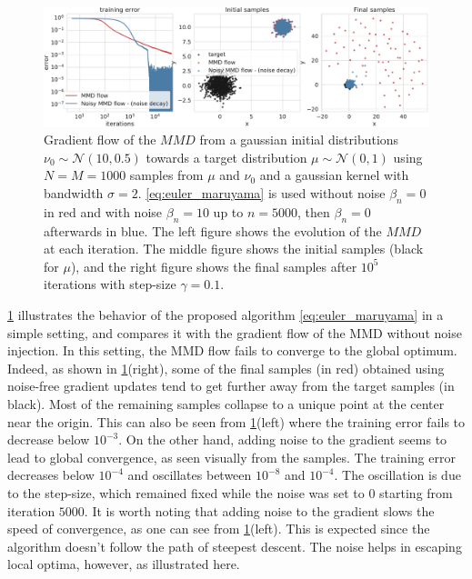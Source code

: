 \begin{figure}[ht]
	\centering
	\includegraphics[width=0.8\linewidth]{figures/Gaussians_error_4}
	\caption{Gradient flow of the $MMD$ from a gaussian initial distributions $\nu_0\sim \mathcal{N}(10,0.5)$  towards a target distribution $\mu\sim \mathcal{N}(0,1)$ using $N=M=1000$ samples from $\mu$ and $\nu_0$ and a gaussian kernel with bandwidth $\sigma = 2 $. \cref{eq:euler_maruyama} is used 
	without noise $\beta_n = 0$ in red and  with noise $\beta_n = 10$ up to $n=5000$, then $\beta_n = 0$ afterwards in blue. 
	The left figure shows the evolution of the $MMD$ at each iteration. The middle figure shows the initial samples (black for $\mu$), and the right figure shows the final samples after $10^5$ iterations with step-size $\gamma = 0.1$.}
	\label{fig:experiments}
\end{figure}
\cref{fig:experiments} illustrates the behavior of the proposed algorithm \cref{eq:euler_maruyama} in a simple setting, and compares it with the gradient flow of the MMD without noise injection. In this setting, the MMD flow  fails to converge to the global optimum. Indeed, as shown in \cref{fig:experiments}(right), some of the final samples (in red) obtained using noise-free gradient updates tend to get further away from the target samples (in black). Most of the remaining samples collapse to a unique point at the center near the origin. This can also be seen from \cref{fig:experiments}(left) where the training error fails to decrease below $10^{-3}$. On the other hand, adding noise to the gradient seems to lead to global convergence, as seen visually from the samples. The training error decreases below $10^{-4}$ and oscillates between $10^{-8}$ and $10^{-4}$. The oscillation is due to the step-size, which remained fixed while the noise was set to $0$ starting from iteration $5000$. It is worth noting that adding noise to the gradient slows the speed of convergence, as one can see from \cref{fig:experiments}(left). This is expected since the algorithm doesn't follow the path of steepest descent. The noise helps in escaping local optima, however, as  illustrated here.
